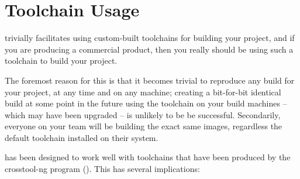 %
%
%
%
\chapter{Toolchain Usage}\label{chap:toolchain-usage}

\lmsbw trivially facilitates using custom-built toolchains for
building your project, and if you are producing a commercial product,
then you really should be using such a toolchain to build your
project.

The foremost reason for this is that it becomes trivial to reproduce
any build for your project, at any time and on any machine; creating a
bit-for-bit identical build at some point in the future using the
toolchain on your build machines -- which may have been upgraded -- is
unlikely to be be successful.  Secondarily, everyone on your team will
be building the exact same images, regardless the default toolchain
installed on their system.

\lmsbw has been designed to work well with toolchains that have been
produced by the crosstool-ng program
().  This has several implications:

